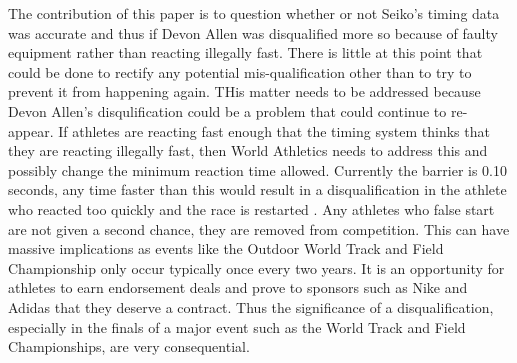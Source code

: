 \documentclass[12pt, letterpaper, titlepage]{article}
\begin{document}
The contribution of this paper is to question whether or not Seiko's timing data
was accurate and thus if Devon Allen was disqualified more so because of faulty
equipment rather than reacting illegally fast.  There is little at this point
that could be done to rectify any potential mis-qualification other than to try
to prevent it from happening again.  THis matter needs to be addressed because Devon Allen's disqulification could be a problem that could continue to re-appear.  If athletes
are reacting fast enough that the timing system thinks that they are reacting
illegally fast, then World Athletics needs to address this and possibly change
the minimum reaction time allowed.  Currently the barrier is 0.10 seconds, any time
faster than this would result in a disqualification in the athlete who reacted too
quickly and the race is restarted \citep{Seiko-Timing}.  Any athletes who false start are not given a second chance, they are removed from competition.  This can have massive implications as events like the Outdoor World Track and Field Championship only occur typically once every two years.  It is an opportunity for athletes to earn endorsement deals and prove to sponsors such as Nike and Adidas that
they deserve a contract.  Thus the significance of a disqualification, especially in the finals of a major event such as the World Track and Field Championships, are very
consequential.  






  
\end{document}
